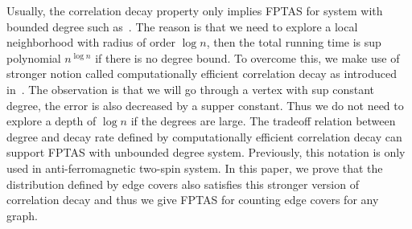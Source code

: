 Usually, the correlation decay property only implies FPTAS for system with bounded degree such as~\cite{}. The reason is that
we need to explore a local neighborhood with radius of order $\log n$, then the total running time is sup polynomial $n^{\log n}$ if there is no degree bound. To overcome this, we make use of stronger notion called computationally efficient correlation decay
as introduced in~\cite{LLY12}. The observation is that we will go through a vertex with sup constant degree, the error is also decreased by a supper constant. Thus we do not need to explore a depth of $\log n$ if the degrees are large. The tradeoff relation between degree and decay rate defined by  computationally efficient correlation decay can support FPTAS with unbounded degree system. Previously, this notation is only used in anti-ferromagnetic two-spin system. In this paper, we prove that the distribution defined by edge covers also satisfies this stronger version of correlation decay and thus we give FPTAS for counting edge covers for any graph.  